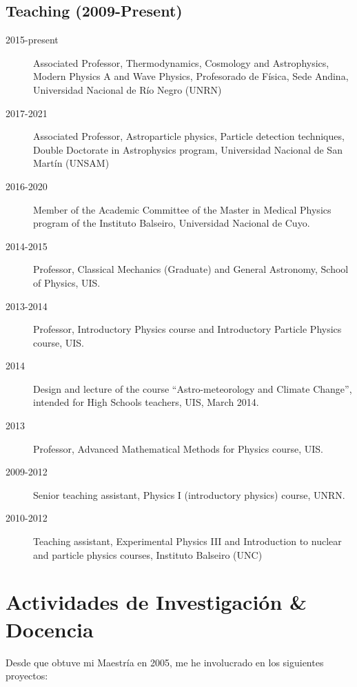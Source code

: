 \subsection*{Teaching (2009-Present)}
\begin{description}
	\item[2015-present] Associated Professor, Thermodynamics, Cosmology and Astrophysics, Modern Physics A and Wave Physics, Profesorado de Física, Sede Andina, Universidad Nacional de Río Negro (UNRN)
	\item[2017-2021] Associated Professor, Astroparticle physics, Particle detection techniques, Double Doctorate in Astrophysics program, Universidad Nacional de San Martín (UNSAM)
	\item[2016-2020] Member of the Academic Committee of the Master in Medical Physics program of the Instituto Balseiro, Universidad Nacional de Cuyo.
	\item[2014-2015] Professor, Classical Mechanics (Graduate) and General Astronomy, School of Physics, UIS.
	\item[2013-2014] Professor, Introductory Physics course and Introductory Particle Physics course, UIS.
	\item[2014] Design and lecture of the course ``Astro-meteorology and Climate Change'', intended for High Schools teachers, UIS, March 2014.
	\item[2013] Professor, Advanced Mathematical Methods for Physics course, UIS.
	\item[2009-2012] Senior teaching assistant, Physics I (introductory physics) course, UNRN.
	\item[2010-2012] Teaching assistant, Experimental Physics III and Introduction to nuclear and particle physics courses, Instituto Balseiro (UNC)
\end{description}
\else
\section*{Actividades de Investigación \& Docencia}

Desde que obtuve mi Maestría en 2005, me he involucrado en los siguientes proyectos:


